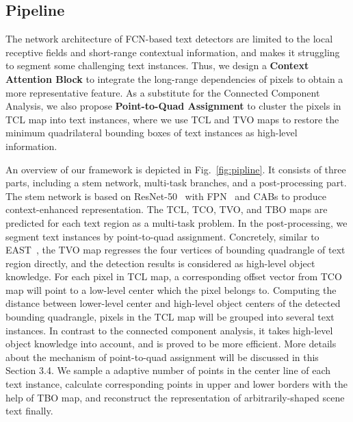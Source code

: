 \documentclass[sigconf]{acmart}
\begin{document}
\subsection{Pipeline}





The network architecture of FCN-based text detectors are limited to the local receptive fields and short-range contextual information, and makes it struggling to segment some challenging text instances. Thus, we design a \textbf{Context Attention Block} to integrate the long-range dependencies of pixels to obtain a more representative feature. As a substitute for the Connected Component Analysis, we also propose \textbf{Point-to-Quad Assignment} to cluster the pixels in TCL map into text instances, where we use TCL and TVO maps to restore the minimum quadrilateral bounding boxes of text instances as high-level information.




An overview of our framework is depicted in Fig.~\ref{fig:pipline}. It consists of three parts, including a stem network, multi-task branches, and a post-processing part. The stem network is based on ResNet-50~\cite{he2016deep} with FPN~\cite{lin2017feature} and CABs to produce context-enhanced representation. The TCL, TCO, TVO, and TBO maps are predicted for each text region as a multi-task problem. In the post-processing, we segment text instances by point-to-quad assignment. Concretely, similar to EAST~\cite{zhou2017east}, the TVO map regresses the four vertices of bounding quadrangle of text region directly, and the detection results is considered as high-level object knowledge. For each pixel in TCL map, a corresponding offset vector from TCO map will point to a low-level center which the pixel belongs to. Computing the distance between lower-level center and high-level object centers of the detected bounding quadrangle, pixels in the TCL map will be grouped into several text instances. In contrast to the connected component analysis, it takes high-level object knowledge into account, and is proved to be more efficient. More details about the mechanism of point-to-quad assignment will be discussed in this Section 3.4. We sample a adaptive number of points in the center line of each text instance, calculate corresponding points in upper and lower borders with the help of TBO map, and reconstruct the representation of arbitrarily-shaped scene text finally.
\end{document}
